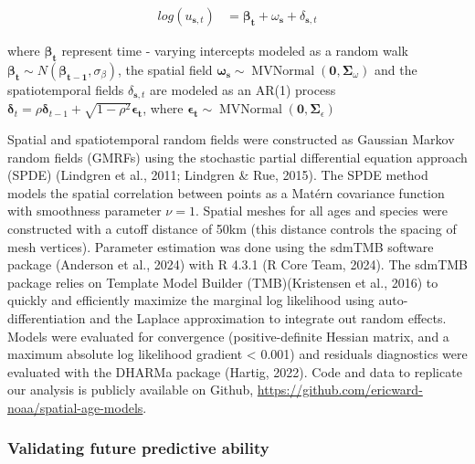 \documentclass[
]{article}
\begin{document}
\[
\begin{aligned}
log \left( u_{\boldsymbol{s},t} \right) &= \boldsymbol{\beta_{t}} + \omega_{\boldsymbol{s}} + \delta_{\boldsymbol{s},t}
\end{aligned}
\]

where \(\boldsymbol{\beta_{t}}\) represent time - varying intercepts
modeled as a random walk
\(\boldsymbol{\beta_{t}} \sim N \left( \boldsymbol{\beta_{t-1}}, \sigma_\beta \right)\),
the spatial field
\(\boldsymbol{\omega_{s}} \sim \operatorname{MVNormal} \left( \boldsymbol{0}, \boldsymbol{\Sigma}_\omega \right)\)
and the spatiotemporal fields \(\delta_{\boldsymbol{s},t}\) are modeled
as an AR(1) process
\(\boldsymbol{\delta}_{t} = \rho \boldsymbol{\delta}_{t-1} + \sqrt{1 - \rho^2} \boldsymbol{\epsilon_{t}}\),
where
\(\boldsymbol{\epsilon_{t}} \sim \operatorname{MVNormal} \left(\boldsymbol{0}, \boldsymbol{\Sigma}_{\epsilon} \right)\)

Spatial and spatiotemporal random fields were constructed as Gaussian
Markov random fields (GMRFs) using the stochastic partial differential
equation approach (SPDE) (Lindgren et al., 2011; Lindgren \& Rue, 2015).
The SPDE method models the spatial correlation between points as a
Matérn covariance function with smoothness parameter \(\nu = 1\).
Spatial meshes for all ages and species were constructed with a cutoff
distance of 50km (this distance controls the spacing of mesh vertices).
Parameter estimation was done using the sdmTMB software package
(Anderson et al., 2024) with R 4.3.1 (R Core Team, 2024). The sdmTMB
package relies on Template Model Builder (TMB)(Kristensen et al., 2016)
to quickly and efficiently maximize the marginal log likelihood using
auto-differentiation and the Laplace approximation to integrate out
random effects. Models were evaluated for convergence (positive-definite
Hessian matrix, and a maximum absolute log likelihood gradient
\textless{} 0.001) and residuals diagnostics were evaluated with the
DHARMa package (Hartig, 2022). Code and data to replicate our analysis
is publicly available on Github,
\url{https://github.com/ericward-noaa/spatial-age-models}.

\subsubsection{Validating future predictive
ability}\label{validating-future-predictive-ability}
\end{document}
